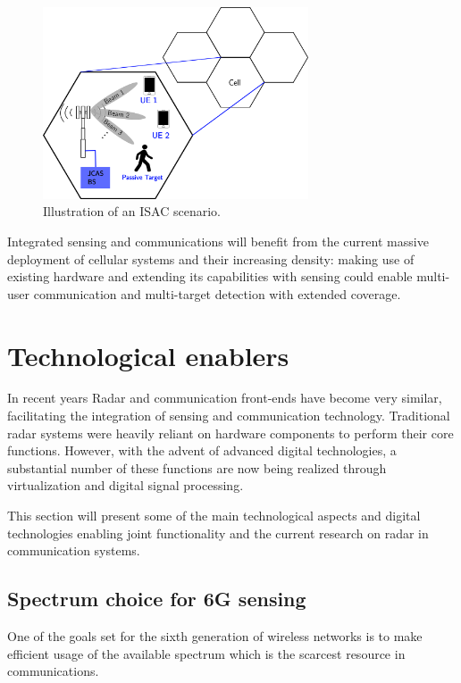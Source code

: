 \begin{figure}[H]
	\centering
	\includegraphics[width=0.7\textwidth]{Images/introduction/isac-scheme-1.png}
	\caption{Illustration of an ISAC scenario.}
	\label{fig:isac-scheme-1}
\end{figure}


Integrated sensing and communications will benefit from the current massive deployment of cellular systems and their increasing density: making use of existing hardware and extending its capabilities with sensing could enable multi-user communication and multi-target detection with extended coverage.



\section{Technological enablers}
	
	In recent years Radar and communication front-ends have become very similar, facilitating the integration of sensing and communication technology.
	Traditional radar systems were heavily reliant on hardware components to perform their core functions. However, with the advent of advanced digital technologies, a substantial number of these functions are now being realized through virtualization and digital signal processing. 

	This section will present some of the main technological aspects and digital technologies enabling joint functionality and the current research on radar in communication systems.	
	
	\subsection{Spectrum choice for 6G sensing}

	One of the goals set for the sixth generation of wireless networks is to make efficient usage of the available spectrum which is the scarcest resource in communications.
	
